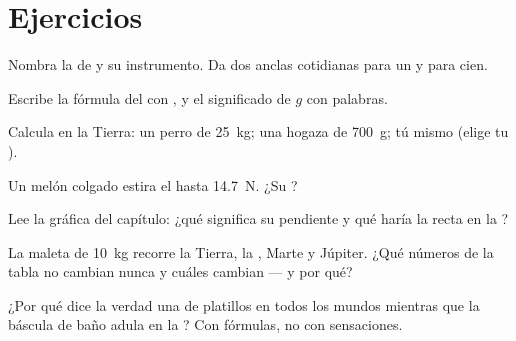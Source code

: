 \section{Ejercicios}

\begin{exercise}[$\star$]\label{exo:g9:weight-vs-mass:1}
Nombra la  de  y su instrumento. Da dos
anclas cotidianas para un  y para cien.
\end{exercise}

\begin{exercise}[$\star$]\label{exo:g9:weight-vs-mass:2}
Escribe la fórmula del  con , y el
significado de $g$ con palabras.
\end{exercise}

\begin{exercise}[$\star$]\label{exo:g9:weight-vs-mass:3}
Calcula  en la Tierra: un perro de \qty{25}{kg}; una hogaza
de \qty{700}{g}; tú mismo (elige tu ).
\end{exercise}

\begin{exercise}[$\star$]\label{exo:g9:weight-vs-mass:4}
Un melón colgado estira el  hasta \qty{14.7}{N}. ¿Su
?
\end{exercise}

\begin{exercise}[$\star$]\label{exo:g9:weight-vs-mass:5}
Lee la gráfica del capítulo: ¿qué significa su pendiente y qué haría la
recta en la ?
\end{exercise}

\begin{exercise}[$\star$]\label{exo:g9:weight-vs-mass:6}
La maleta de \qty{10}{kg} recorre la Tierra, la , Marte y
Júpiter. ¿Qué números de la tabla no cambian nunca y cuáles cambian ---
y por qué?
\end{exercise}

\begin{exercise}[$\star$]\label{exo:g9:weight-vs-mass:7}
¿Por qué dice la verdad una  de platillos en todos los mundos
mientras que la báscula de baño adula en la ? Con fórmulas,
no con sensaciones.
\end{exercise}

